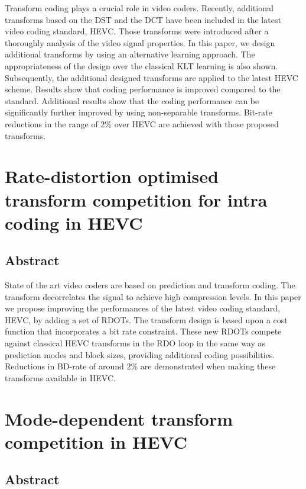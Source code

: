 \documentclass[11pt,a4paper,openright,twoside]{book}
\numberwithin{equation}{section} %
\numberwithin{figure}{section} %
\numberwithin{table}{section} %
\begin{document}
Transform coding plays a crucial role in video coders.
Recently, additional transforms based on the \acs{DST} and the \acs{DCT} have
been included in the latest video coding standard, \acs{HEVC}.
Those transforms were introduced after a thoroughly analysis of the video
signal properties.
In this paper, we design additional transforms by using an alternative
learning approach.
The appropriateness of the design over the classical \acs{KLT} learning is
also shown.
Subsequently, the additional designed transforms are applied to the latest
\acs{HEVC} scheme.
Results show that coding performance is improved compared to the standard.
Additional results show that the coding performance can be significantly
further improved by using non-separable transforms.
Bit-rate reductions in the range of 2\% over \acs{HEVC} are achieved with
those proposed transforms.

\section*{Rate-distortion optimised transform competition for intra coding in
HEVC}
\label{sec:rate_distortion_optimised_transform_competition_for_intra_coding_in_hevc}

\subsection*{Abstract}
\label{sub:tc_abstract}

State of the art video coders are based on prediction and transform coding.
The transform decorrelates the signal to achieve high compression levels.
In this paper we propose improving the performances of the latest video coding
standard, \acs{HEVC}, by adding a set of \acp{RDOT}.
The transform design is based upon a cost function that incorporates a bit
rate constraint.
These new \acp{RDOT} compete against classical \acs{HEVC} transforms in the
\ac{RDO} loop in the same way as prediction modes and block sizes, providing
additional coding possibilities.
Reductions in \acs{BD}-rate of around 2\% are demonstrated when making these
transforms available in \acs{HEVC}.

\section*{Mode-dependent transform competition in HEVC}
\label{sec:mode_dependent_transform_competition_in_hevc}

\subsection*{Abstract}
\label{sub:mdtc_abstract}
\end{document}

